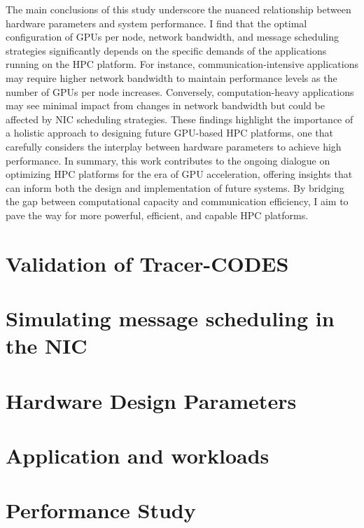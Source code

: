 The main conclusions of this study underscore the nuanced relationship between hardware parameters and system performance. I find that the optimal configuration of GPUs per node, network bandwidth, and message scheduling strategies significantly depends on the specific demands of the applications running on the HPC platform. For instance, communication-intensive applications may require higher network bandwidth to maintain performance levels as the number of GPUs per node increases. Conversely, computation-heavy applications may see minimal impact from changes in network bandwidth but could be affected by NIC scheduling strategies. These findings highlight the importance of a holistic approach to designing future GPU-based HPC platforms, one that carefully considers the interplay between hardware parameters to achieve high performance.
In summary, this work contributes to the ongoing dialogue on optimizing HPC platforms for the era of GPU acceleration, offering insights that can inform both the design and implementation of future systems. By bridging the gap between computational capacity and communication efficiency, I aim to pave the way for more powerful, efficient, and capable HPC platforms.

\section{Validation of Tracer-CODES}


\section{Simulating message scheduling in the NIC}


\section{Hardware Design Parameters}



\section{Application and workloads}


\section{Performance Study}


